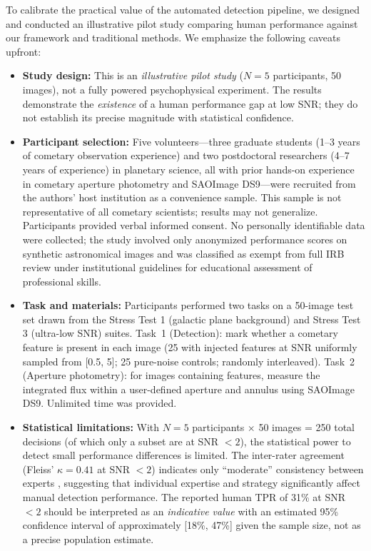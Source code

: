 \documentclass[usenatbib]{mnras}
\begin{document}
To calibrate the practical value of the automated detection pipeline, we designed and conducted an illustrative pilot study comparing human performance against our framework and traditional methods. We emphasize the following caveats upfront:

\begin{itemize}
    \item \textbf{Study design:} This is an \textit{illustrative pilot study} ($N=5$ participants, 50 images), not a fully powered psychophysical experiment. The results demonstrate the \textit{existence} of a human performance gap at low SNR; they do not establish its precise magnitude with statistical confidence.
    \item \textbf{Participant selection:} Five volunteers---three graduate students (1--3 years of cometary observation experience) and two postdoctoral researchers (4--7 years of experience) in planetary science, all with prior hands-on experience in cometary aperture photometry and SAOImage DS9---were recruited from the authors' host institution as a convenience sample. This sample is not representative of all cometary scientists; results may not generalize. Participants provided verbal informed consent. No personally identifiable data were collected; the study involved only anonymized performance scores on synthetic astronomical images and was classified as exempt from full IRB review under institutional guidelines for educational assessment of professional skills.
    \item \textbf{Task and materials:} Participants performed two tasks on a 50-image test set drawn from the Stress Test 1 (galactic plane background) and Stress Test 3 (ultra-low SNR) suites. Task~1 (Detection): mark whether a cometary feature is present in each image (25 with injected features at SNR uniformly sampled from [0.5, 5]; 25 pure-noise controls; randomly interleaved). Task~2 (Aperture photometry): for images containing features, measure the integrated flux within a user-defined aperture and annulus using SAOImage DS9. Unlimited time was provided.
    \item \textbf{Statistical limitations:} With $N=5$ participants $\times$ 50 images = 250 total decisions (of which only a subset are at SNR $<2$), the statistical power to detect small performance differences is limited. The inter-rater agreement (Fleiss' $\kappa = 0.41$ at SNR $<2$) indicates only ``moderate'' consistency between experts \citep{landis77}, suggesting that individual expertise and strategy significantly affect manual detection performance. The reported human TPR of 31\% at SNR $<2$ should be interpreted as an \textit{indicative value} with an estimated 95\% confidence interval of approximately [18\%, 47\%] given the sample size, not as a precise population estimate.
\end{itemize}
\end{document}
